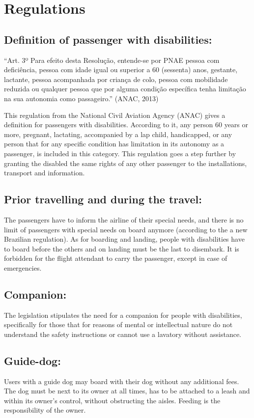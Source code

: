 \documentclass[a4paper, 12pt,conference]{new_cit_thesis}
\begin{document}
\section*{Regulations}
\subsection{Definition of passenger with disabilities:}
“Art. 3º Para efeito desta Resolução, entende-se por PNAE pessoa com deficiência, pessoa com idade igual ou superior a 60 (sessenta) anos, gestante, lactante, pessoa acompanhada por criança de colo, pessoa com mobilidade reduzida ou qualquer pessoa que por alguma condição específica tenha limitação na sua autonomia como passageiro.” (ANAC, 2013)

This regulation from the National Civil Aviation Agency (ANAC) gives a definition for passengers with disabilities. According to it, any person 60 years or more, pregnant, lactating, accompanied by a lap child, handicapped, or any person that for any specific condition has limitation in its autonomy as a passenger, is included in this category.   This regulation goes a step further by granting the disabled the same rights of any other passenger to the installations, transport and information.

\subsection{Prior travelling and during the travel:}
The passengers have to inform the airline of their special needs, and there is no limit of passengers with special needs on board anymore (according to the a new Brazilian regulation). As for boarding and landing, people with disabilities have to board before the others and on landing must be the last to disembark. It is forbidden for the flight attendant to carry the passenger, except in case of emergencies.

\subsection{Companion:}
The legislation stipulates the need for a companion for people with disabilities, specifically for those that for reasons of mental or intellectual nature do not understand the safety instructions or cannot use a lavatory without assistance.

\subsection{Guide-dog:}
Users with a guide dog may board with their dog without any additional fees. The dog must be next to its owner at all times, has to be attached to a leash and within its owner’s control, without obstructing the aisles. Feeding is the responsibility of the owner.
\end{document}
